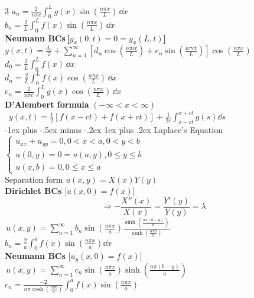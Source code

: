 \documentclass[10pt,landscape]{article}
\makeatletter
\renewcommand{\subsubsection}{\@startsection{subsubsection}{3}{0mm}%
                                    {-1ex plus -.5ex minus -.2ex}%
                                    {1ex plus .2ex}%
                                    {\normalfont\small\bfseries}}
\makeatother
\begin{document}
\begin{multicols}{3}
        \qquad$\displaystyle a_n = \frac{2}{n\pi c}\int_0^L g(x)\sin\left(\frac{n\pi x}{L}\right)\, \dd x$\\[10pt]
        \qquad$\displaystyle b_n = \frac{2}{L}\int_0^L f(x)\sin\left(\frac{n\pi x}{L}\right)\, \dd x$\\[10pt]
        \textbf{Neumann BCs}\,\textbf{[}$y_x(0,t) = 0 = y_x(L,t)$\textbf{]}
        \,\,\,$\displaystyle y(x,t)=\frac{d_0}{2}+\sum_{n=1}^{\infty}\left[d_n \cos\!\left(\frac{n\pi c t}{L}\right)+
    e_n \sin\!\left(\frac{n\pi c t}{L}\right)\right]
    \cos\!\left(\frac{n\pi x}{L}\right)$\\[10pt]
        \qquad $\displaystyle d_0 = \frac{2}{L}\int_0^L f(x)\,\dd x$\\[10pt]
        \qquad $\displaystyle d_n = \frac{2}{L}\int_0^L f(x) \cos\!\left(\frac{n\pi x}{L}\right)\,\dd x$\\[10pt]
        \qquad$\displaystyle
        e_n = \frac{2}{n\pi c}\int_0^L g(x)
        \cos\!\left(\frac{n\pi x}{L}\right)\,\dd x$\\[10pt]
        
        \textbf{D'Alembert formula} $(-\infty<x<\infty)$\\[6pt] 
        \,\,\,$\displaystyle y(x,t)= \frac{1}{2}[f(x-ct) + f(x+ct)] + \frac{1}{2c}\int_{x-ct}^{x+ct}g(s) \dd s$\\[10pt]

        \subsubsection{Laplace's Equation} $\begin{cases} u_{xx}+u_{yy} =0, 0< x<a, 0 <y<b\\
        u(0,y) = 0 = u(a,y), 0\le y \le b\\
        u(x,b) = 0, 0\le x\le a 
        \end{cases}$\\[6pt]
        Separation form \qquad $u(x,y) = X(x)Y(y)$\\[6pt]
        \textbf{Dirichlet BCs} $\textbf{[}u(x,0) = f(x)\textbf{]}$ \\
        \[\Rightarrow -\frac{X''(x)}{X(x)}=\frac{Y'(y)}{Y(y)} = \lambda\]
        \,$u(x,y) = \displaystyle \sum_{n=1}^{\infty} b_n\sin\left(\frac{n\pi x}{a}\right)\frac{\sinh\left(\frac{n\pi (b-y)}{a}\right)}{\sinh\left(\frac{n\pi b}{a}\right)}$\\[4pt]
        \qquad $ \displaystyle b_n = \frac{2}{a}\int_{0}^{a} f(x)\sin\left(\frac{n\pi x}{a}\right) \dd x$\\[10pt]
        \textbf{Neumann BCs} $\textbf{[}u_y(x,0) = f(x)\textbf{]}$ \\[4pt]
        \,$u(x,y) = \displaystyle \sum_{n=1}^\infty c_n \sin\left(\frac{n\pi x}{a}\right)\sinh\left(\frac{n\pi (b-y)}{a}\right)$\\
        \qquad $c_n = \displaystyle\frac{-2}{n\pi\cosh(\frac{n\pi b}{a})}\int_0^af(x)\sin\left(\frac{n\pi x}{a}\right)$



\end{multicols}
\end{document}
